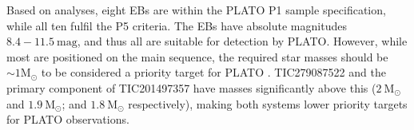 Based on analyses, eight EBs are within the PLATO P1 sample specification, while all ten fulfil the P5 criteria. The EBs have absolute magnitudes $8.4 - 11.5 \mathrm{\ mag}$, and thus all are suitable for detection by PLATO. However, while most are positioned on the main sequence, the required star masses should be $\sim 1 \mathrm{M_{\odot}}$ to be considered a priority target for PLATO \citep{Rauer24}. TIC279087522 and the primary component of TIC201497357 have masses significantly above this ($2\ \mathrm{M_{\odot}}$ and $1.9\ \mathrm{M_{\odot}}$; and $ 1.8\ \mathrm{M_{\odot}}$ respectively), making both systems lower priority targets for PLATO observations.\\


 

